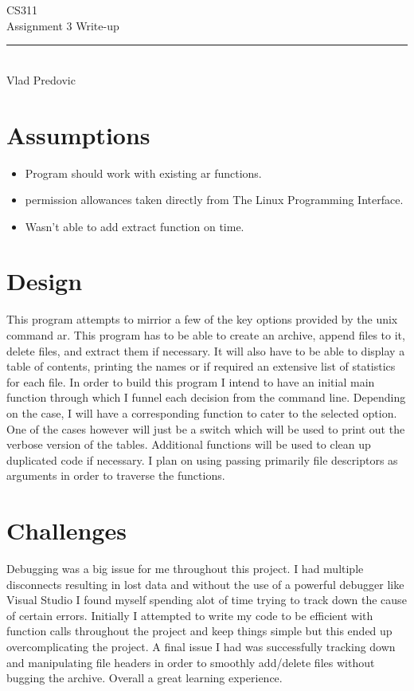 \documentclass[letterpaper,10pt]{article}
\begin{document}
\begin{titlepage}
    \vspace*{4cm}
    \begin{flushleft}
    {\huge
        CS311\\[.5cm]
    }
    {\large
        Assignment 3 Write-up
    }
    \end{flushleft}
    \vfill
    \rule{5in}{.5mm}\\
    Vlad Predovic

\end{titlepage}

\section{Assumptions}
\begin{itemize}
\item Program should work with existing ar functions.
\item permission allowances taken directly from The Linux Programming Interface.
\item Wasn't able to add extract function on time.
\end{itemize}

\section{Design}

This program attempts to mirrior a few of the key options provided by the unix command ar. This program has to be able to create an archive, append files to it, delete files, and extract them if necessary. It 
will also have to be able to display a table of contents, printing the names or if required an extensive list of statistics for each file.
In order to build this program I intend to have an initial main function through which I funnel each decision from the command line. Depending on the case, I will have a corresponding function to cater to
the selected option. One of the cases however will just be a switch which will be used to print out the verbose version of the tables. Additional functions will be used to clean up duplicated code
if necessary. I plan on using passing primarily file descriptors as arguments in order to traverse the functions.




\section{Challenges}
Debugging was a big issue for me throughout this project. I had multiple disconnects resulting in lost data and without the use of a powerful debugger like Visual Studio I found myself spending alot of 
time trying to track down the cause of certain errors. Initially I attempted to write my code to be efficient with function calls throughout the project and keep things simple but this ended up overcomplicating the
project. A final issue I had was successfully tracking down and manipulating file headers in order to smoothly add/delete files without bugging the archive.
Overall a great learning experience.
\end{document}
